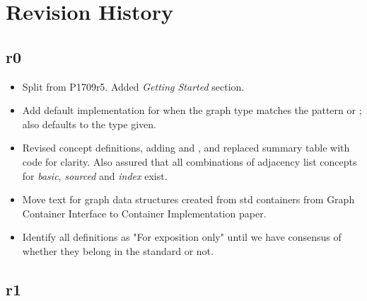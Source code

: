 \section{Revision History}

\subsection*{\paperno r0}

\begin{itemize}
      \item Split from P1709r5. Added \textit{Getting Started} section.
      \item Add default implementation for  when the graph type matches the 
            pattern  or ;
             also defaults to the  type given.
      \item Revised concept definitions, adding  and , and replaced
            summary table with code for clarity. Also assured that all combinations of adjacency list concepts for
            \textit{basic}, \textit{sourced} and \textit{index} exist.
      \item Move text for graph data structures created from std containers from Graph Container Interface to 
            Container Implementation paper.
      \item Identify all  definitions as "For exposition only" until we have consensus of whether they 
            belong in the standard or not.
\end{itemize}

\subsection*{\paperno r1}


